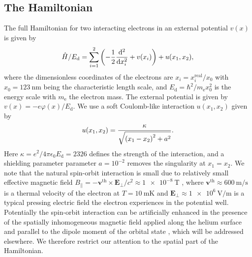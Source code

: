 \documentclass[twocolumn,superscriptaddress,unsortedaddress,
 amsmath,amssymb,
 aps,
]{revtex4-2}
\begin{document}
    \subsection{The Hamiltonian}
        The full Hamiltonian for two interacting electrons in an external
        potential $v(x)$ is given by
        \begin{align}
            \hat{H}/E_{\mathrm{d}}
            = \sum_{i = 1}^{2}\qty(
                -\frac{1}{2}\dv[2]{}{x_i}
                + v(x_i)
            )
            + u(x_1, x_2),
            \label{eq:hamiltonian}
        \end{align}
        where the dimensionless coordinates of the electrons are $x_i = x_i^{\mathrm{real}}/x_0$ with $x_0 = \SI{123}{\nm}$ being the characteristic length scale, and $E_{\mathrm{d}} = \hbar^2/m_{\mathrm{e}} x_0^2$ is the energy scale with $m_{\mathrm{e}}$ the electron mass.
        The external potential is given by $v(x) = -e \varphi(x) / E_{\mathrm{d}}$.
        We use a soft Coulomb-like interaction $u(x_1, x_2)$ given by
        \begin{align}
            u(x_1, x_2)
            =
            \frac{\kappa}{\sqrt{\qty(x_1 - x_2)^2 + a^2}}.
            \label{eq:soft-coulomb}
        \end{align}
        Here $\kappa = e^2/4 \pi \epsilon_0 E_{\mathrm{d}} = 2326$ defines the strength of the interaction, and a shielding parameter parameter $a=10^{-2}$ removes the singularity at $x_1 = x_2$.
        We note that the natural spin-orbit interaction is small due to relatively small effective magnetic field $B_{||} = -\mathbf{v}^{\mathrm{th}} \times \mathbf{E}_{\perp}/c^2 \approx \SI{1e-8}{\tesla}$ \cite{lyon2006spin}, where $\mathbf{v}^{\mathrm{th}} \approx \SI{600}{\meter\per\s}$ is a thermal velocity of the electron at $T = \SI{10}{\milli\kelvin}$ and $\mathbf{E}_{\perp} \approx \SI{1e6}{\volt\per\meter}$ is a typical pressing electric field the electron experiences in the potential well.
        Potentially the spin-orbit interaction can be artificially enhanced in the presence of the spatially inhomogeneous magnetic field applied along the helium surface and parallel to the dipole moment of the orbital state \cite{schuster2010proposal}, which will be addressed elsewhere. 
        We therefore restrict our attention to the spatial part of the Hamiltonian.
\end{document}

